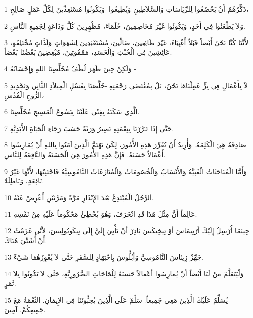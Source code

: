 \par 1 ذَكِّرْهُمْ أَنْ يَخْضَعُوا لِلرِّيَاسَاتِ وَالسَّلاَطِينِ وَيُطِيعُوا، وَيَكُونُوا مُسْتَعِدِّينَ لِكُلِّ عَمَلٍ صَالِحٍ،
\par 2 وَلاَ يَطْعَنُوا فِي أَحَدٍ، وَيَكُونُوا غَيْرَ مُخَاصِمِينَ، حُلَمَاءَ، مُظْهِرِينَ كُلَّ وَدَاعَةٍ لِجَمِيعِ النَّاسِ.
\par 3 لأَنَّنَا كُنَّا نَحْنُ أَيْضاً قَبْلاً أَغْبِيَاءَ، غَيْرَ طَائِعِينَ، ضَالِّينَ، مُسْتَعْبَدِينَ لِشَهَوَاتٍ وَلَذَّاتٍ مُخْتَلِفَةٍ، عَائِشِينَ فِي الْخُبْثِ وَالْحَسَدِ، مَمْقُوتِينَ، مُبْغِضِينَ بَعْضُنَا بَعْضاً.
\par 4 وَلَكِنْ حِينَ ظَهَرَ لُطْفُ مُخَلِّصِنَا اللهِ وَإِحْسَانُهُ -
\par 5 لاَ بِأَعْمَالٍ فِي بِرٍّ عَمِلْنَاهَا نَحْنُ، بَلْ بِمُقْتَضَى رَحْمَتِهِ -خَلَّصَنَا بِغَسْلِ الْمِيلاَدِ الثَّانِي وَتَجْدِيدِ الرُّوحِ الْقُدُسِ،
\par 6 الَّذِي سَكَبَهُ بِغِنًى عَلَيْنَا بِيَسُوعَ الْمَسِيحِ مُخَلِّصِنَا.
\par 7 حَتَّى إِذَا تَبَرَّرْنَا بِنِعْمَتِهِ نَصِيرُ وَرَثَةً حَسَبَ رَجَاءِ الْحَيَاةِ الأَبَدِيَّةِ.
\par 8 صَادِقَةٌ هِيَ الْكَلِمَةُ. وَأُرِيدُ أَنْ تُقَرِّرَ هَذِهِ الأُمُورَ، لِكَيْ يَهْتَمَّ الَّذِينَ آمَنُوا بِاللهِ أَنْ يُمَارِسُوا أَعْمَالاً حَسَنَةً. فَإِنَّ هَذِهِ الأُمُورَ هِيَ الْحَسَنَةُ وَالنَّافِعَةُ لِلنَّاسِ.
\par 9 وَأَمَّا الْمُبَاحَثَاتُ الْغَبِيَّةُ وَالأَنْسَابُ وَالْخُصُومَاتُ وَالْمُنَازَعَاتُ النَّامُوسِيَّةُ فَاجْتَنِبْهَا، لأَنَّهَا غَيْرُ نَافِعَةٍ، وَبَاطِلَةٌ.
\par 10 اَلرَّجُلُ الْمُبْتَدِعُ بَعْدَ الإِنْذَارِ مَرَّةً وَمَرَّتَيْنِ أَعْرِضْ عَنْهُ.
\par 11 عَالِماً أَنَّ مِثْلَ هَذَا قَدِ انْحَرَفَ، وَهُوَ يُخْطِئُ مَحْكُوماً عَلَيْهِ مِنْ نَفْسِهِ.
\par 12 حِينَمَا أُرْسِلُ إِلَيْكَ أَرْتِيمَاسَ أَوْ تِيخِيكُسَ بَادِرْ أَنْ تَأْتِيَ إِلَيَّ إِلَى نِيكُوبُولِيسَ، لأَنِّي عَزَمْتُ أَنْ أُشَتِّيَ هُنَاكَ.
\par 13 جَهِّزْ زِينَاسَ النَّامُوسِيَّ وَأَبُلُّوسَ بِاجْتِهَادٍ لِلسَّفَرِ حَتَّى لاَ يُعْوِزَهُمَا شَيْءٌ.
\par 14 وَلْيَتَعَلَّمْ مَنْ لَنَا أَيْضاً أَنْ يُمَارِسُوا أَعْمَالاً حَسَنَةً لِلْحَاجَاتِ الضَّرُورِيَّةِ، حَتَّى لاَ يَكُونُوا بِلاَ ثَمَرٍ.
\par 15 يُسَلِّمُ عَلَيْكَ الَّذِينَ مَعِي جَمِيعاً. سَلِّمْ عَلَى الَّذِينَ يُحِبُّونَنَا فِي الإِيمَانِ. النِّعْمَةُ مَعَ جَمِيعِكُمْ. آمِينَ.

